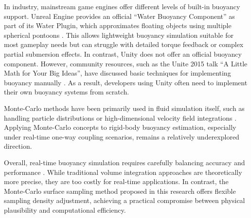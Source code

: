 In industry, mainstream game engines offer different levels of built-in buoyancy support. Unreal Engine provides an official ``Water Buoyancy Component'' as part of its Water Plugin, which approximates floating objects using multiple spherical pontoons \cite{UnrealWaterBuoyancyComponent}. This allows lightweight buoyancy simulation suitable for most gameplay needs but can struggle with detailed torque feedback or complex partial submersion effects. In contrast, Unity does not offer an official buoyancy component. However, community resources, such as the Unite 2015 talk ``A Little Math for Your Big Ideas'', have discussed basic techniques for implementing buoyancy manually \cite{Unite2015ALittle}. As a result, developers using Unity often need to implement their own buoyancy systems from scratch.

Monte-Carlo methods have been primarily used in fluid simulation itself, such as handling particle distributions or high-dimensional velocity field integrations \cite{rioux2022monte}\cite{sugimoto2024velocity}. Applying Monte-Carlo concepts to rigid-body buoyancy estimation, especially under real-time one-way coupling scenarios, remains a relatively underexplored direction.

Overall, real-time buoyancy simulation requires carefully balancing accuracy and performance \cite{liu2021faster}. While traditional volume integration approaches are theoretically more precise, they are too costly for real-time applications. In contrast, the Monte-Carlo surface sampling method proposed in this research offers flexible sampling density adjustment, achieving a practical compromise between physical plausibility and computational efficiency.